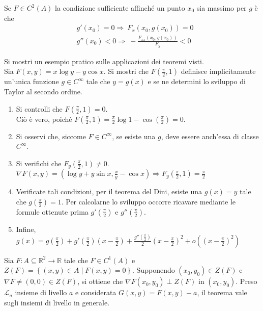 \begin{oss}
    Se $F \in C^2(A)$ la condizione sufficiente affinché un punto $x_0$ sia massimo per $g$ è che
    \begin{equation}
        \begin{aligned}
            &g'(x_0)=0 \Rightarrow\ F_x(x_0, g(x_0))=0\\
            &g''(x_0)<0 \Rightarrow\ -\frac{F_{xx}(x_0, g(x_0))}{F_y} < 0
        \end{aligned}
    \end{equation}
\end{oss}
\begin{example}
    Si mostri un esempio pratico sulle applicazioni dei teoremi visti.\\
    Sia $F(x,y)=x \log y - y \cos x$. Si mostri che $F\left(\tfrac{\pi}{2}, 1\right)$ definisce implicitamente un'unica funzione $g \in C^\infty$ tale che $y=g(x)$ e se ne determini lo sviluppo di Taylor al secondo ordine. 
    \begin{enumerate}
        \item Si controlli che $F\left(\tfrac{\pi}{2}, 1\right)=0$.\\
        Ciò è vero, poiché $F\left(\tfrac{\pi}{2}, 1\right)=\tfrac{\pi}{2} \log 1 - \cos\left(\tfrac{\pi}{2}\right)=0$.
        \item Si osservi che, siccome $F \in C^\infty$, se esiste una $g$, deve essere anch'essa di classe $C^\infty$.
        \item Si verifichi che $F_y(\tfrac{\pi}{2}, 1) \neq 0$.\\
        $\nabla F(x, y) = (\log y + y \sin{x}, \tfrac{x}{y}- \cos{x}) \Rightarrow F_y(\tfrac{\pi}{2},1)=\tfrac{\pi}{2}$
        \item Verificate tali condizioni, per il teorema del Dini, esiste una $g(x)=y$ tale che $g(\tfrac{\pi}{2})=1$. Per calcolarne lo sviluppo occorre ricavare mediante le formule ottenute prima $g'(\tfrac{\pi}{2})$ e $g''(\tfrac{\pi}{2})$.
        \item Infine, $g(x)=g(\tfrac{\pi}{2}) + g'(\tfrac{\pi}{2})(x-\tfrac{\pi}{2})+ \tfrac{g''(\tfrac{\pi}{2})}{2}(x-\tfrac{\pi}{2})^2+ o((x-\tfrac{\pi}{2})^2)$
    \end{enumerate}
\end{example}
\begin{theorem} \label{Teo: Ortogonalità del gradiente alle curve di livello}
    Sia $F: A \subseteq \mathbb{R}^2 \to \mathbb{R}$ tale che $F \in C^1(A)$ e $Z(F)= \left\{(x,y) \in A \mid F(x,y)=0\right\}$. Supponendo $(x_0,y_0) \in Z(F)$ e $\nabla F \neq (0,0) \in Z(F)$, si ottiene che $\nabla F(x_0,y_0) \perp Z(F)$ in $(x_0, y_0)$. Preso $\mathcal{L}_a$ insieme di livello $a$ e considerata $G(x,y)=F(x,y)-a$, il teorema vale sugli insiemi di livello in generale.
\end{theorem}
